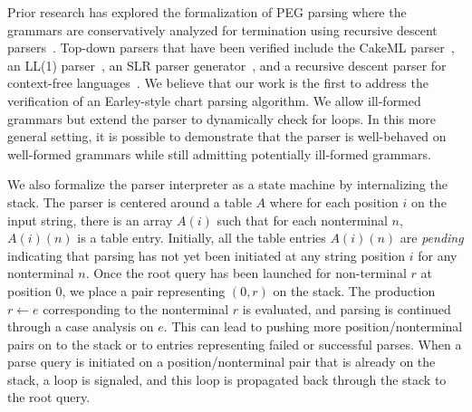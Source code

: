 \documentclass[sigplan,10pt,anonymous,review]{acmart}\settopmatter{printfolios=true,printccs=false,printacmref=false}
\newcommand{\prodn}[2]{#1 \leftarrow #2}
\begin{document}
\begin{CCSXML}
Prior research has explored the formalization of PEG parsing
where the grammars are conservatively analyzed for termination using recursive
descent parsers~\cite{trx,blaudeau2020verified}\@.  Top-down parsers
that have been verified include the CakeML parser~\cite{DBLP:conf/popl/KumarMNO14},
an LL(1) parser~\cite{DBLP:conf/itp/LasserCFR19}, an SLR parser generator~\cite{conf/esop/BarthwalN09}, and a recursive descent parser for context-free languages~\cite{conf/cpp/Ridge11}\@.  We believe that our work is the first to address the
verification of an Earley-style chart parsing algorithm.  We allow ill-formed
grammars but extend the parser to dynamically check for loops.  
In this more general setting, it is possible to demonstrate that the
parser is well-behaved on well-formed grammars while still admitting potentially
ill-formed grammars.  

We also formalize the parser interpreter as a state machine by
internalizing the stack. The parser is centered around a table
$A$ where for each position $i$ on the input string, there is
an array $A(i)$ such that for each nonterminal $n$, $A(i)(n)$ is a
table entry.  Initially, all the table entries $A(i)(n)$ are
\emph{pending} indicating that parsing has not yet been initiated at
any string position $i$ for any nonterminal $n$\@.  Once the root
query has been launched for non-terminal $r$ at position $0$, we place
a pair representing $(0, r)$ on the stack.  The production
$\prodn{r}{e}$ corresponding to the nonterminal $r$ is evaluated, and
parsing is continued through a case analysis on $e$.  This can lead to
pushing more position/nonterminal pairs on to the stack or to entries
representing failed or successful parses.  When a parse query is
initiated on a position/nonterminal pair that is already on the stack,
a loop is signaled, and this loop is propagated back through the stack
to the root query.


\end{CCSXML}
\end{document}
